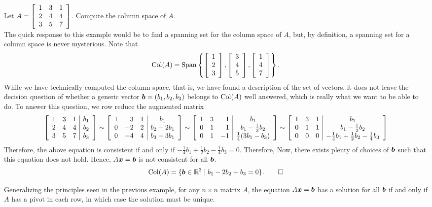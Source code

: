 \begin{Exam} Let $A = \mtx{rrr}{1 & 3 & 1\\ 2 & 4 & 4\\ 3 & 5 & 7}$. Compute the column space of $A$.\\

The quick response to this example would be to find a spanning set for the column space of $A$, but, by definition, a spanning set for a column space is never mysterious. Note that 
\[\col(A) = \Span\left\{\vr{1\\2\\3}, \vr{3\\4\\5}, \vr{1\\4\\7}\right\}.\] While we have technically computed the column space, that is, we have found a description of the set of vectors, it does not leave the decision question of whether a generic vector $\bb b = (b_1, b_2, b_3)$ belongs to $\col(A)$ well answered, which is really what we want to be able to do. To answer this question, we row reduce the augmented matrix
\begin{multline*}
\mtx{rrr|r}{1 & 3 & 1 & b_1\\ 2 & 4 & 4 & b_2\\ 3 & 5 & 7 & b_3} \sim \mtx{rrr|c}{1 & 3 & 1 & b_1\\ 0 & -2 & 2 & b_2-2b_1\\ 0 & -4 & 4 & b_3-3b_1} \sim \mtx{rrr|c}{1 & 3 & 1 & b_1\\ 0 & 1 & 1 & b_1-\frac{1}{2}b_2\\ 0 & 1 & -1 & \frac{1}{4}(3b_1-b_3)}
\sim \mtx{rrr|c}{1 & 3 & 1 & b_1\\ 0 & 1 & 1 & b_1-\frac{1}{2}b_2\\ 0 & 0 & 0 & -\frac{1}{4}b_1+\frac{1}{2}b_2-\frac{1}{4}b_3}
\end{multline*}
Therefore, the above equation is consistent if and only if $-\frac{1}{4}b_1+\frac{1}{2}b_2-\frac{1}{4}b_3 = 0$. Therefore, Now, there exists plenty of choices of $\bb b$ such that this equation does not hold. Hence, $A\bb x = \bb b$ is not consistent for all $\bb b$. \[\col(A) = \{\bb b \in \R^3\mid b_1-2b_2+b_3=0\}. \qedhere\] 
\end{Exam}\vs

Generalizing the principles seen in the previous example, for any $n\times n$ matrix $A$, the equation $A\bb x = \bb b$ has a solution for all $\bb b$ if and only if $A$ has a pivot in each row, in which case the solution must be unique.\\

